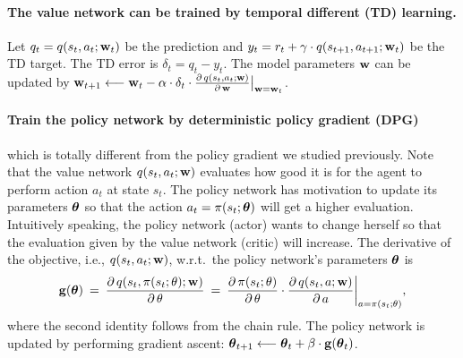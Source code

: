 \documentclass[11pt]{article}
\numberwithin{equation}{section}
\def\g{{\bf g}}
\def\w{{\bf w}}
\def\tha{\mbox{\boldmath$\theta$\unboldmath}}
\begin{document}
\paragraph{The value network can be trained by temporal different (TD) learning.}
Let $q_t = q (s_t , a_t ; \w_t )$ be the prediction and $y_t = r_t + \gamma \cdot q (s_{t+1} , a_{t+1} ; \w_t )$ be the TD target.
The TD error is $\delta_t = q_t - y_t$.
The model parameters $\w$ can be updated by $\w_{t+1}\longleftarrow \w_t - \alpha \cdot \delta_t \cdot \frac{\partial \, q (s_t , a_t ; \w )}{\partial \, \w}\big|_{\w=\w_t}$.





\paragraph{Train the policy network by deterministic policy gradient (DPG)} which is totally different from the policy gradient we studied previously.
Note that the value network $q (s_t, a_t; \w)$ evaluates how good it is for the agent to perform action $a_t$ at state $s_t$.
The policy network has motivation to update its parameters $\tha$ so that the action $a_t = \pi (s_t ; \tha)$ will get a higher evaluation.
Intuitively speaking, the policy network (actor) wants to change herself so that the evaluation given by the value network (critic) will increase.
The derivative of the objective, i.e., $q (s_t, a_t; \w)$, w.r.t.\ the policy network's parameters $\tha$ is
\begin{equation*}
    \g (\tha) 
    \: = \: \frac{\partial \, q (s_t , \pi (s_t ; \theta) ; \w )}{\partial \, \theta}
    \: = \: \frac{\partial \, \pi (s_t ; \theta) }{\partial \, \theta} 
    \cdot  \frac{\partial \, q (s_t , a; \w )}{\partial \, a} \bigg|_{a=\pi (s_t ; \theta) } ,
\end{equation*}
where the second identity follows from the chain rule.
The policy network is updated by performing gradient ascent: $\tha_{t+1} \longleftarrow \tha_t + \beta \cdot \g (\tha_t )$.






\end{document}

